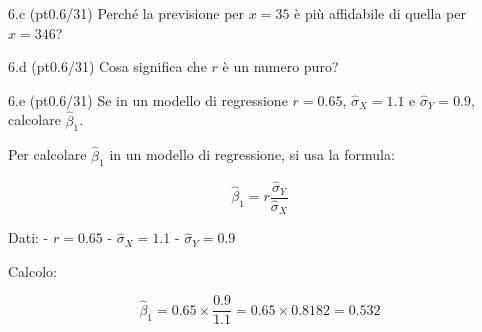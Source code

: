 \documentclass[
  10pt,
]{article}
\begin{document}
6.c (pt\hspace{.1em}0.6/31) Perché la previsione per \(x=35\) è più affidabile di quella per \(x=346\)?

6.d (pt\hspace{.1em}0.6/31) Cosa significa che \(r\) è un numero puro?

6.e (pt\hspace{.1em}0.6/31) Se in un modello di regressione \(r=0.65\), \(\hat\sigma_X=1.1\) e \(\hat\sigma_Y=0.9\), calcolare \(\hat\beta_1\).

\begin{sol}
Per calcolare \(\hat\beta_1\) in un modello di regressione, si usa la formula:

\[
\hat\beta_1 = r \frac{\hat\sigma_Y}{\hat\sigma_X}
\]

Dati:
- \(r = 0.65\)
- \(\hat\sigma_X = 1.1\)
- \(\hat\sigma_Y = 0.9\)

Calcolo:

\[
\hat\beta_1 = 0.65 \times \frac{0.9}{1.1} = 0.65 \times 0.8182 = 0.532
\]

\end{sol}
\end{document}

